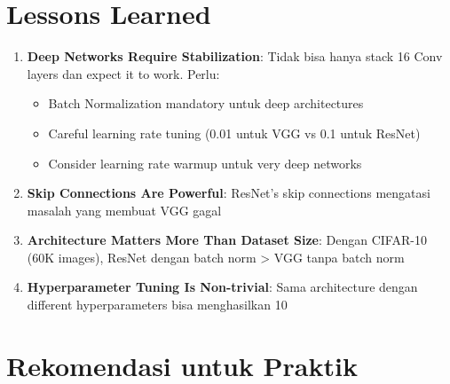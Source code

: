 \documentclass[12pt,a4paper]{report}
\begin{document}
\section{Lessons Learned}

\begin{enumerate}
    \item \textbf{Deep Networks Require Stabilization}: Tidak bisa hanya stack 16 Conv layers dan expect it to work. Perlu:
    \begin{itemize}
        \item Batch Normalization mandatory untuk deep architectures
        \item Careful learning rate tuning (0.01 untuk VGG vs 0.1 untuk ResNet)
        \item Consider learning rate warmup untuk very deep networks
    \end{itemize}
    
    \item \textbf{Skip Connections Are Powerful}: ResNet's skip connections mengatasi masalah yang membuat VGG gagal
    
    \item \textbf{Architecture Matters More Than Dataset Size}: Dengan CIFAR-10 (60K images), ResNet dengan batch norm > VGG tanpa batch norm
    
    \item \textbf{Hyperparameter Tuning Is Non-trivial}: Sama architecture dengan different hyperparameters bisa menghasilkan 10%
\end{enumerate}

\section{Rekomendasi untuk Praktik}
\end{document}
